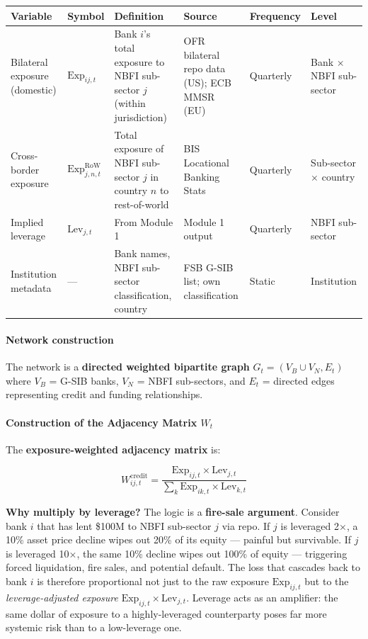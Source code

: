 \documentclass[11pt,a4paper]{article}
\begin{document}
{\small
\begin{longtable}{|p{}|p{}|p{}|p{}|p{}|p{}|}
\hline
\textbf{Variable} & \textbf{Symbol} & \textbf{Definition} & \textbf{Source} & \textbf{Frequency} & \textbf{Level} \\
\hline
\endhead
Bilateral exposure (domestic) & $\text{Exp}_{ij,t}$ & Bank $i$'s total exposure to NBFI sub-sector $j$ (within jurisdiction) & OFR bilateral repo data (US); ECB MMSR (EU) & Quarterly & Bank $\times$ NBFI sub-sector \\
\hline
Cross-border exposure & $\text{Exp}_{j,n,t}^{\text{RoW}}$ & Total exposure of NBFI sub-sector $j$ in country $n$ to rest-of-world & BIS Locational Banking Stats & Quarterly & Sub-sector $\times$ country \\
\hline
Implied leverage & $\text{Lev}_{j,t}$ & From Module 1 & Module 1 output & Quarterly & NBFI sub-sector \\
\hline
Institution metadata & --- & Bank names, NBFI sub-sector classification, country & FSB G-SIB list; own classification & Static & Institution \\
\hline
\end{longtable}
}


\paragraph{Network construction}

The network is a \textbf{directed weighted bipartite graph} $G_t = (V_B \cup V_N, E_t)$ where $V_B$ = G-SIB banks, $V_N$ = NBFI sub-sectors, and $E_t$ = directed edges representing credit and funding relationships.


\paragraph{Construction of the Adjacency Matrix $W_t$}

The \textbf{exposure-weighted adjacency matrix} is:

\[W_{ij,t}^{\text{credit}} = \frac{\text{Exp}_{ij,t} \times \text{Lev}_{j,t}}{\sum_k \text{Exp}_{ik,t} \times \text{Lev}_{k,t}}\]

\textbf{Why multiply by leverage?} The logic is a \textbf{fire-sale argument}. Consider bank $i$ that has lent \$100M to NBFI sub-sector $j$ via repo. If $j$ is leveraged 2$\times$, a 10\% asset price decline wipes out 20\% of its equity --- painful but survivable. If $j$ is leveraged 10$\times$, the same 10\% decline wipes out 100\% of equity --- triggering forced liquidation, fire sales, and potential default. The loss that cascades back to bank $i$ is therefore proportional not just to the raw exposure $\text{Exp}_{ij,t}$ but to the \textit{leverage-adjusted exposure} $\text{Exp}_{ij,t} \times \text{Lev}_{j,t}$. Leverage acts as an amplifier: the same dollar of exposure to a highly-leveraged counterparty poses far more systemic risk than to a low-leverage one.
\end{document}
